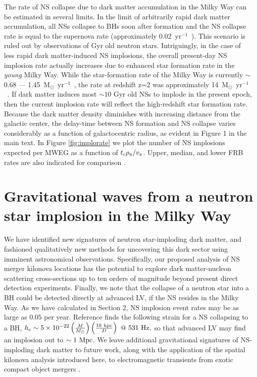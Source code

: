 \documentclass[nofootinbib,longbibliography,prd,floatfix,superscriptaddress,twocolumn]{revtex4-1}
\begin{document}
The rate of NS collapse due to dark matter accumulation in the Milky Way can be estimated in several limits. In the limit of arbitrarily rapid dark matter accumulation, all NSs collapse to BHs soon after formation and the NS collapse rate is equal to the supernova rate (approximately 0.02~yr$^{-1}$~\citep{Diehl:2006cf}). This scenario is ruled out by observations of Gyr old neutron stars. Intriguingly, in the case of less rapid dark matter-induced NS implosions, the overall present-day NS implosion rate actually increases due to enhanced star formation rate in the \emph{young} Milky Way. While the star-formation rate of the Milky Way is currently $\sim$0.68 --- 1.45~M$_\odot$~yr$^{-1}$~\cite{2010ApJ...710L..11R}, the rate at redshift z=2 was approximately 14~M$_\odot$~yr$^{-1}$~\cite{vanDokkum:2013hza, 2014ApJ...781L..31S, 2015MNRAS.451.4223M}. If dark matter induces most $\sim 10$ Gyr old NSs to implode in the present epoch, then the current implosion rate will reflect the high-redshift star formation rate. Because the dark matter density diminishes with increasing distance from the galactic center, the delay-time between NS formation and NS collapse varies considerably as a function of galactocentric radius, as evident in Figure 1 in the main text. In Figure \ref{fig:implorate} we plot the number of NS implosions expected per MWEG as a function of $t_{\rm c} \rho_{\rm x} /v_{\rm x}$. Upper, median, and lower  FRB rates are also indicated for comparison \cite{Rane:2015sxa,Wiel:2016pdl}. 


\section{Gravitational waves from a neutron star implosion in the Milky Way}
\label{sec:conc}
We have identified new signatures of neutron star-imploding dark matter, and fashioned qualitatively new methods for uncovering this dark sector using imminent astronomical observations. Specifically, our proposed analysis of NS merger kilonova locations has the potential to explore dark matter-nucleon scattering cross-sections up to ten orders of magnitude beyond present direct detection experiments. Finally, we note that the collapse of a neutron star into a BH could be detected directly at advanced LV, if the NS resides in the Milky Way. As we have calculated in Section 2, NS implosion event rates may be as large as $0.05$ per year. Reference \cite{Baiotti:2007np} finds the following strain for a NS collapsing to a BH,
$
h_c \sim 5 \times 10^{-22} \left( \frac{M}{M_\odot} \right) \left( \frac{\rm 10 ~kpc}{D} \right)  ~@~ 531~{\rm Hz},
$
so that advanced LV \cite{Aasi:2013wya} may find an implosion out to $\sim 1~{\rm Mpc}$. We leave additional gravitational signatures of NS-imploding dark matter to future work, along with the application of the spatial kilonova analysis introduced here, to electromagnetic transients from exotic compact object mergers \cite{Giudice:2016zpa,Bramante:2017xlb}.
\\
\end{document}
